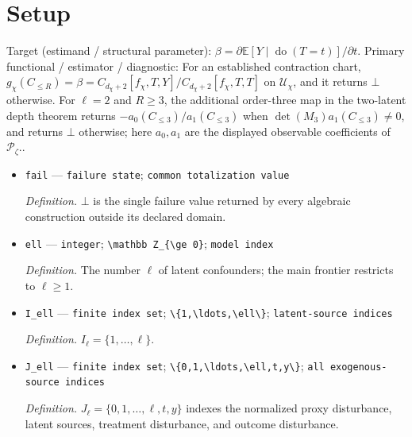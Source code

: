 \documentclass{article}
\begin{document}
\section{Setup}

Target (estimand / structural parameter): \(\beta=\partial\mathbb E[Y\mid\operatorname{do}(T=t)]/\partial t\).
Primary functional / estimator / diagnostic: For an established contraction chart, \(g_{\chi}(C_{\le R})=\beta=C_{d_{\chi}+2}[f_{\chi},T,Y]/C_{d_{\chi}+2}[f_{\chi},T,T]\) on \(\mathcal U_{\chi}\), and it returns \(\bot\) otherwise. For \(\ell=2\) and \(R\ge3\), the additional order-three map in the two-latent depth theorem returns \(-a_0(C_{\le3})/a_1(C_{\le3})\) when \(\det(M_3)a_1(C_{\le3})\ne0\), and returns \(\bot\) otherwise; here \(a_0,a_1\) are the displayed observable coefficients of \(\mathcal P_\zeta\)..
\begin{itemize}
  \item \texttt{fail} --- \texttt{failure state}; \texttt{common totalization value}
  \par\smallskip\noindent\emph{Definition.} \(\bot\) is the single failure value returned by every algebraic construction outside its declared domain.
  \item \texttt{ell} --- \texttt{integer}; \texttt{\textbackslash{}\allowbreak{}mathbb Z\_\allowbreak{}\{\textbackslash{}\allowbreak{}ge 0\}\allowbreak{}}; \texttt{model index}
  \par\smallskip\noindent\emph{Definition.} The number \(\ell\) of latent confounders; the main frontier restricts to \(\ell\ge 1\).
  \item \texttt{I\_\allowbreak{}ell} --- \texttt{finite index set}; \texttt{\textbackslash{}\allowbreak{}\{1,\allowbreak{}\textbackslash{}\allowbreak{}ldots,\allowbreak{}\textbackslash{}\allowbreak{}ell\textbackslash{}\allowbreak{}\}\allowbreak{}}; \texttt{latent-\allowbreak{}source indices}
  \par\smallskip\noindent\emph{Definition.} \(I_{\ell}=\{1,\ldots,\ell\}\).
  \item \texttt{J\_\allowbreak{}ell} --- \texttt{finite index set}; \texttt{\textbackslash{}\allowbreak{}\{0,\allowbreak{}1,\allowbreak{}\textbackslash{}\allowbreak{}ldots,\allowbreak{}\textbackslash{}\allowbreak{}ell,\allowbreak{}t,\allowbreak{}y\textbackslash{}\allowbreak{}\}\allowbreak{}}; \texttt{all exogenous-\allowbreak{}source indices}
  \par\smallskip\noindent\emph{Definition.} \(J_{\ell}=\{0,1,\ldots,\ell,t,y\}\) indexes the normalized proxy disturbance, latent sources, treatment disturbance, and outcome disturbance.

\end{itemize}
\end{document}
